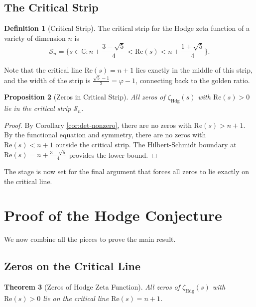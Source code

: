 \documentclass[12pt]{article}
\newtheorem{theorem}{Theorem}[section]
\newtheorem{proposition}[theorem]{Proposition}
\theoremstyle{definition}
\newtheorem{definition}[theorem]{Definition}
\theoremstyle{remark}
\begin{document}
\subsection{The Critical Strip}

\begin{definition}[Critical Strip]
The critical strip for the Hodge zeta function of a variety of dimension $n$ is
\[
\mathcal{S}_n = \{s \in \mathbb{C} : n + \frac{3-\sqrt{5}}{4} < \text{Re}(s) < n + \frac{1+\sqrt{5}}{4}\}.
\]
\end{definition}

Note that the critical line $\text{Re}(s) = n+1$ lies exactly in the middle of this strip, and the width of the strip is $\frac{\sqrt{5}-1}{2} = \varphi - 1$, connecting back to the golden ratio.

\begin{proposition}[Zeros in Critical Strip]
All zeros of $\zeta_{\text{Hdg}}(s)$ with $\text{Re}(s) > 0$ lie in the critical strip $\mathcal{S}_n$.
\end{proposition}

\begin{proof}
By Corollary \ref{cor:det-nonzero}, there are no zeros with $\text{Re}(s) > n+1$.
By the functional equation and symmetry, there are no zeros with $\text{Re}(s) < n+1$ outside the critical strip.
The Hilbert-Schmidt boundary at $\text{Re}(s) = n + \frac{3-\sqrt{5}}{4}$ provides the lower bound.
\end{proof}

The stage is now set for the final argument that forces all zeros to lie exactly on the critical line.

\section{Proof of the Hodge Conjecture}
\label{sec:main-theorem}

We now combine all the pieces to prove the main result.

\subsection{Zeros on the Critical Line}

\begin{theorem}[Zeros of Hodge Zeta Function]
\label{thm:zeros-critical}
All zeros of $\zeta_{\text{Hdg}}(s)$ with $\text{Re}(s) > 0$ lie on the critical line $\text{Re}(s) = n+1$.
\end{theorem}
\end{document}
